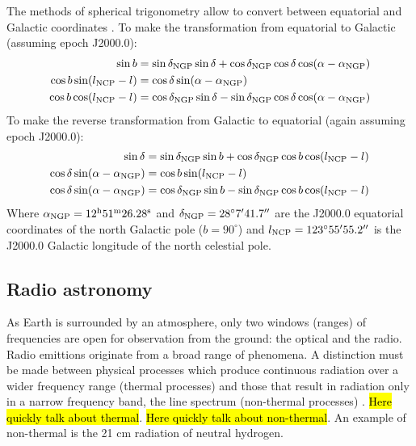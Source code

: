 The methods of spherical trigonometry allow to convert between equatorial and Galactic coordinates \Cite{carroll_introduction_2007}. To make the transformation from equatorial to Galactic (assuming epoch J2000.0):
\begin{align}
    \sin b &= \sin \delta_{\text{NGP}} \sin \delta + \cos \delta_{\text{NGP}} \cos \delta \cos (\alpha - \alpha_{\text{NGP}}) \\
    \cos b \sin(l_{\text{NCP}} - l) &= \cos \delta \sin(\alpha - \alpha_{\text{NGP}}) \\
    \cos b \cos (l_{\text{NCP}} - l) &= \cos \delta_{\text{NGP}} \sin \delta - \sin \delta_{\text{NGP}} \cos \delta \cos(\alpha - \alpha_{\text{NGP}})
\end{align}
To make the reverse transformation from Galactic to equatorial (again assuming epoch J2000.0):
\begin{align}
    \sin \delta &= \sin \delta_{\text{NGP}} \sin b + \cos \delta_{\text{NGP}} \cos b \cos (l_{\text{NCP}} - l) \\
    \cos \delta \sin(\alpha - \alpha_{\text{NGP}}) &= \cos b \sin(l_{\text{NCP}} - l) \\
    \cos \delta \sin(\alpha - \alpha_{\text{NGP}}) &= \cos \delta_{\text{NGP}} \sin b - \sin \delta_{\text{NGP}} \cos b \cos (l_{\text{NCP}} - l)
\end{align}
Where $\alpha_{\text{NGP}} = 12^{\text{h}} 51^{\text{m}} 26.28^{\text{s}}$ and $\delta_{\text{NGP}} = 28^{\circ}7' 41.7''$ are the J2000.0 equatorial coordinates of the north Galactic pole ($b = 90^{\circ}$) and $l_{\text{NCP}} = 123^{\circ} 55' 55.2''$ is the J2000.0 Galactic longitude of the north celestial pole.

\subsection{Radio astronomy}
As Earth is surrounded by an atmosphere, only two windows (ranges) of frequencies are open for observation from the ground: the optical and the radio.
Radio emittions originate from a broad range of phenomena.
A distinction must be made between physical processes which produce continuous radiation over a wider frequency range (thermal processes) and those that result in radiation only in a narrow frequency band, the line spectrum (non-thermal processes) \cite{lauterbach_radio_2022}.
\hl{Here quickly talk about thermal}.
\hl{Here quickly talk about non-thermal}.
An example of non-thermal is the 21 cm radiation of neutral hydrogen.

